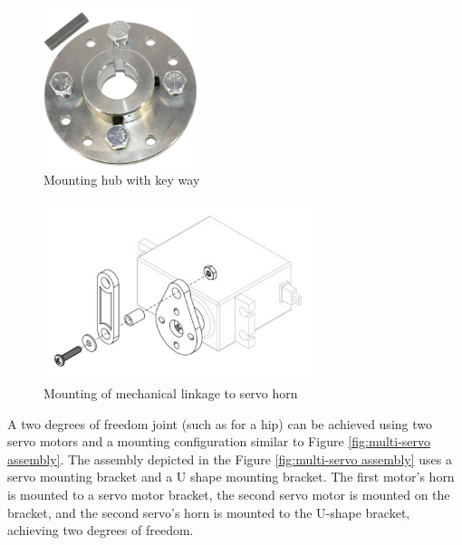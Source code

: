 \begin{figure}[H]
    \centering
    \includegraphics[width=0.4\textwidth]{Sections/LiteratureReview/img/LegAssembly/MountingHub_key.jpg}
    \caption{Mounting hub with key way \cite{gopowersports_sprocket_nodate}}
    \label{fig:mountinghub_key}
\end{figure}

\begin{figure}[H]
    \centering
    \includegraphics[width=0.7\textwidth]{Sections/LiteratureReview/img/LegAssembly/horn_linkage.jpg}
    \caption{Mounting of mechanical linkage to servo horn \cite{pololu_pololu_nodate}}
    \label{fig:servo-horn-linkage}
\end{figure}

 A two degrees of freedom joint (such as for a hip) can be achieved using two servo motors and a mounting configuration similar to Figure \ref{fig:multi-servo assembly}. The assembly depicted in the Figure \ref{fig:multi-servo assembly} uses a servo mounting bracket and a U shape mounting bracket. The first motor's horn is mounted to a servo motor bracket, the second servo motor is mounted on the bracket, and the second servo's horn is mounted to the U-shape bracket, achieving two degrees of freedom. 

